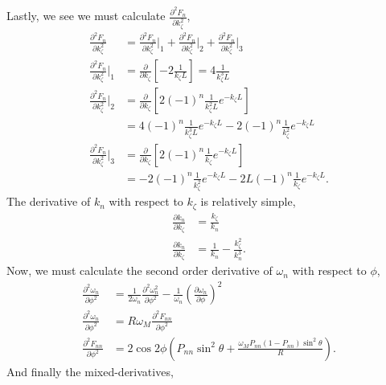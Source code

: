 \documentclass{article}
\begin{document}
Lastly, we see we must calculate $\frac{\partial^2 F_{n}}{\partial k_{\zeta}^2}$,
\begin{align}
\frac{\partial^2 F_{n}}{\partial k_{\zeta}^2} &= \frac{\partial^2 F_{n}}{\partial k_{\zeta}^2}\bigg|_{1} + \frac{\partial^2 F_{n}}{\partial k_{\zeta}^2}\bigg|_{2} + \frac{\partial^2 F_{n}}{\partial k_{\zeta}^2}\bigg|_{3} \\
\frac{\partial^2 F_{n}}{\partial k_{\zeta}^2}\bigg|_{1} &= \frac{\partial}{\partial k_{\zeta}} \left[-2 \frac{1}{k_{\zeta}L} \right]= 4 \frac{1}{k_{\zeta}^3 L} \\
\frac{\partial^2 F_{n}}{\partial k_{\zeta}^2}\bigg|_{2} &= \frac{\partial}{\partial k_{\zeta}} \left[ 2 (-1)^n \frac{1}{k_{\zeta}^2 L} e^{-k_{\zeta} L } \right] \\
&= 4 (-1)^n \frac{1}{k_{\zeta}^3 L} e^{-k_{\zeta} L} - 2 (-1)^n \frac{1}{k_{\zeta}^2} e^{- k_{\zeta} L} \\
\frac{\partial^2 F_{n}}{\partial k_{\zeta}^2}\bigg|_{3} &= \frac{\partial}{\partial k_{\zeta}} \left[ 2 (-1)^n \frac{1}{k_{\zeta}} e^{- k_{\zeta} L } \right] \\
&= -2 (-1)^n \frac{1}{k_{\zeta}^2} e^{- k_{\zeta} L } - 2L (-1)^n \frac{1}{k_{\zeta}} e^{- k_{\zeta} L}.
\end{align}
The derivative of $k_{n}$ with respect to $k_{\zeta}$ is relatively simple,
\begin{align}
\frac{\partial k_{n}}{\partial k_{\zeta}} &= \frac{k_{\zeta}}{k_{n}} \\
\frac{\partial k_{n}}{\partial k_{\zeta}} &= \frac{1}{k_{n}} - \frac{k_{\zeta}^2}{k_{n}^3}.
\end{align}
Now, we must calculate the second order derivative of $\omega_{n}$ with respect to $\phi$,
\begin{align}
\frac{\partial^2 \omega_{n}}{\partial \phi^2} &= \frac{1}{2 \omega_{n}} \frac{\partial^2 \omega_{n}^2}{\partial \phi^2} - \frac{1}{\omega_{n}} \left(\frac{\partial \omega_{n}}{\partial \phi}\right)^2 \\
\frac{\partial^2 \omega_{n}}{\partial \phi^2} &= R \omega_{M} \frac{\partial^2 F_{nn}}{\partial \phi^2} \\
\frac{\partial^2 F_{nn}}{\partial \phi^2} &= 2 \cos{2\phi} \left( P_{nn} \sin^2{\theta} + \frac{\omega_{M} P_{nn} (1-P_{nn}) \sin^2{\theta}}{R} \right).
\end{align}
And finally the mixed-derivatives,
\end{document}
